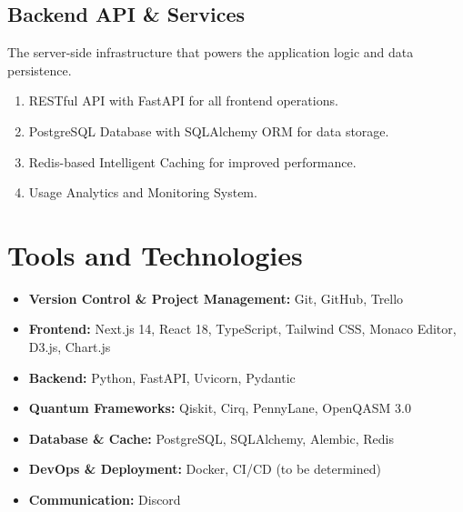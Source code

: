 \subsection{Backend API \& Services}
The server-side infrastructure that powers the application logic and data persistence.
\begin{enumerate}
    \item RESTful API with FastAPI for all frontend operations.
    \item PostgreSQL Database with SQLAlchemy ORM for data storage.
    \item Redis-based Intelligent Caching for improved performance.
    \item Usage Analytics and Monitoring System.
\end{enumerate}

\section{Tools and Technologies}
\begin{itemize}
    \item \textbf{Version Control \& Project Management:} Git, GitHub, Trello
    \item \textbf{Frontend:} Next.js 14, React 18, TypeScript, Tailwind CSS, Monaco Editor, D3.js, Chart.js
    \item \textbf{Backend:} Python, FastAPI, Uvicorn, Pydantic
    \item \textbf{Quantum Frameworks:} Qiskit, Cirq, PennyLane, OpenQASM 3.0
    \item \textbf{Database \& Cache:} PostgreSQL, SQLAlchemy, Alembic, Redis
    \item \textbf{DevOps \& Deployment:} Docker, CI/CD (to be determined)
    \item \textbf{Communication:} Discord
\end{itemize}

